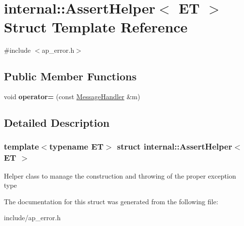 \hypertarget{structinternal_1_1AssertHelper}{}\section{internal\+:\+:Assert\+Helper$<$ ET $>$ Struct Template Reference}
\label{structinternal_1_1AssertHelper}


{\ttfamily \#include $<$ap\+\_\+error.\+h$>$}

\subsection*{Public Member Functions}
\begin{DoxyCompactItemize}
\item 
\mbox{\label{structinternal_1_1AssertHelper_ae21bfed47132220a08a67e1b9b57e5f5}} 
void {\bfseries operator=} (const \hyperlink{classinternal_1_1MessageHandler}{Message\+Handler} \&m)
\end{DoxyCompactItemize}


\subsection{Detailed Description}
\subsubsection*{template$<$typename ET$>$\newline
struct internal\+::\+Assert\+Helper$<$ E\+T $>$}

Helper class to manage the construction and throwing of the proper exception type 

The documentation for this struct was generated from the following file\+:\begin{DoxyCompactItemize}
\item 
include/ap\+\_\+error.\+h\end{DoxyCompactItemize}
